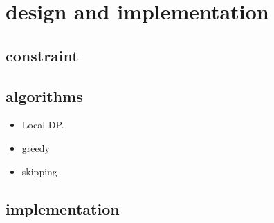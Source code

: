 \section{design and implementation}
\subsection{constraint}
\subsection{algorithms}
\begin{itemize}
  \item
    {
      Local DP.
    }
  \item
    {
      greedy
    }
  \item
    {
      skipping
    }
\end{itemize}
\subsection{implementation}
